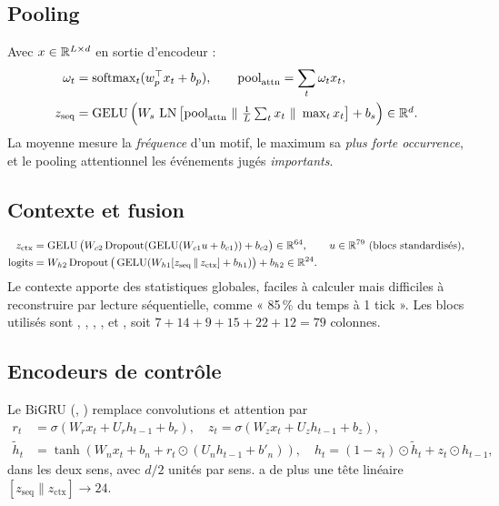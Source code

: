 \subsection{Pooling}
Avec $x\in\mathbb{R}^{L\times d}$ en sortie d'encodeur :
\begin{align}
\omega_t&=\softmax_t(w_p^\top x_t+b_p),\qquad \text{pool}_{\text{attn}}=\sum_t\omega_tx_t,\\
z_{\text{seq}}&=\GELU\Big(W_s\,\LN\big[\text{pool}_{\text{attn}}\ \|\ \tfrac1L\textstyle\sum_tx_t\ \|\ \max_tx_t\big]+b_s\Big)\in\R^{d}.
\end{align}
La moyenne mesure la \emph{fréquence} d'un motif, le maximum sa \emph{plus forte occurrence}, et le pooling attentionnel les événements jugés \emph{importants}.

\subsection{Contexte et fusion}
\begin{align}
z_{\text{ctx}}&=\operatorname{GELU}\big(W_{c2}\operatorname{Dropout}(\operatorname{GELU}(W_{c1}u+b_{c1}))+b_{c2}\big)\in\mathbb{R}^{64},\qquad u\in\mathbb{R}^{79}\ \text{(blocs standardisés)},\\
\text{logits}&=W_{h2}\operatorname{Dropout}\big(\operatorname{GELU}(W_{h1}[z_{\text{seq}}\,\|\,z_{\text{ctx}}]+b_{h1})\big)+b_{h2}\in\mathbb{R}^{24} .
\end{align}
Le contexte apporte des statistiques globales, faciles à calculer mais difficiles à reconstruire par lecture séquentielle, comme « 85\,\% du temps à 1 tick ». Les blocs utilisés sont , , , ,  et , soit $7+14+9+15+22+12=79$ colonnes.

\subsection{Encodeurs de contrôle}
Le BiGRU (, ) remplace convolutions et attention par
\begin{align}
r_t&=\sigma(W_rx_t+U_rh_{t-1}+b_r),\quad z_t=\sigma(W_zx_t+U_zh_{t-1}+b_z),\\
\tilde h_t&=\tanh(W_nx_t+b_n+r_t\odot(U_nh_{t-1}+b'_n)),\quad h_t=(1-z_t)\odot\tilde h_t+z_t\odot h_{t-1},
\end{align}
dans les deux sens, avec $d/2$ unités par sens.  a de plus une tête linéaire $[z_{\text{seq}}\|z_{\text{ctx}}]\to24$.

